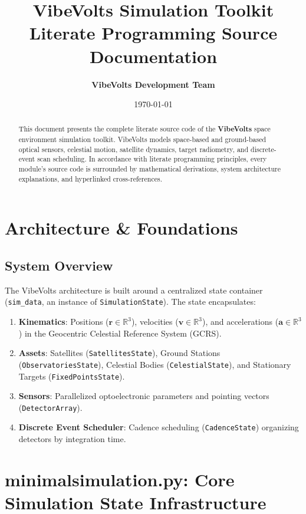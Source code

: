 \documentclass[10pt,a4paper]{report}
\title{\textbf{VibeVolts Simulation Toolkit}\\
\large Literate Programming Source Documentation}
\author{\textbf{VibeVolts Development Team}}
\date{\today}
\begin{document}
\maketitle

\begin{abstract}
This document presents the complete literate source code of the \textbf{VibeVolts} space environment simulation toolkit. VibeVolts models space-based and ground-based optical sensors, celestial motion, satellite dynamics, target radiometry, and discrete-event scan scheduling. In accordance with literate programming principles, every module's source code is surrounded by mathematical derivations, system architecture explanations, and hyperlinked cross-references.
\end{abstract}

\tableofcontents
\newpage

\chapter{Architecture \& Foundations}
\section{System Overview}
The VibeVolts architecture is built around a centralized state container (\texttt{sim\_data}, an instance of \texttt{SimulationState}). The state encapsulates:
\begin{enumerate}
    \item \textbf{Kinematics}: Positions ($\mathbf{r} \in \mathbb{R}^3$), velocities ($\mathbf{v} \in \mathbb{R}^3$), and accelerations ($\mathbf{a} \in \mathbb{R}^3$) in the Geocentric Celestial Reference System (GCRS).
    \item \textbf{Assets}: Satellites (\texttt{SatellitesState}), Ground Stations (\texttt{ObservatoriesState}), Celestial Bodies (\texttt{CelestialState}), and Stationary Targets (\texttt{FixedPointsState}).
    \item \textbf{Sensors}: Parallelized optoelectronic parameters and pointing vectors (\texttt{DetectorArray}).
    \item \textbf{Discrete Event Scheduler}: Cadence scheduling (\texttt{CadenceState}) organizing detectors by integration time.
\end{enumerate}



\chapter{minimalsimulation.py: Core Simulation State Infrastructure}
\label{sec:minimalsimulation}
\end{document}
